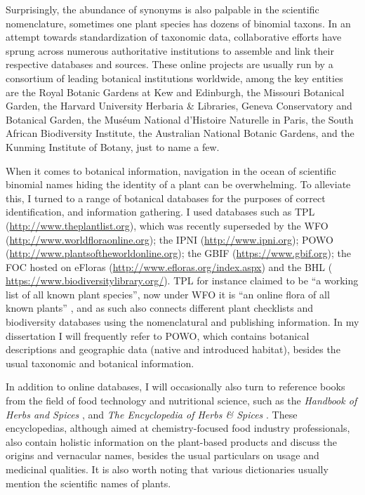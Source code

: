 Surprisingly, the abundance of synonyms is also palpable in the scientific nomenclature, sometimes one plant species has dozens of binomial \glspl{taxon}. In an attempt towards standardization of taxonomic data, collaborative efforts have sprung across numerous authoritative institutions to assemble and link their respective databases and sources. These online projects are usually run by a consortium of leading botanical institutions worldwide, among the key entities are the Royal Botanic Gardens at Kew and Edinburgh, the Missouri Botanical Garden, the Harvard University Herbaria \& Libraries, Geneva Conservatory and Botanical Garden, the Muséum National d'Histoire Naturelle in Paris, the South African Biodiversity Institute, the Australian National Botanic Gardens, and the Kunming Institute of Botany, just to name a few.

When it comes to botanical information, navigation in the ocean of scientific binomial names hiding the identity of a plant can be overwhelming. To alleviate this, I turned to a range of botanical databases for the purposes of correct identification, and information gathering. I used databases such as \gls{TPL} (\url{http://www.theplantlist.org}), which was recently superseded by the \gls{WFO} (\url{http://www.worldfloraonline.org}); the \gls{IPNI} (\url{http://www.ipni.org}); \gls{POWO} (\url{http://www.plantsoftheworldonline.org}); the \gls{GBIF} (\url{https://www.gbif.org}); the \gls{FOC} hosted on eFloras (\url{http://www.efloras.org/index.aspx}) and the \gls{BHL} (\url{ https://www.biodiversitylibrary.org/}). \gls{TPL} for instance claimed to be ``a working list of all known plant species'', now under \gls{WFO} it is ``an online flora of all known plants'' , and as such also connects different plant checklists and biodiversity databases using the nomenclatural and publishing information. In my dissertation I will frequently refer to \gls{POWO}, which contains botanical descriptions and geographic data (native and introduced habitat), besides the usual taxonomic and botanical information. 

In addition to online databases, I will occasionally also turn to reference books from the field of food technology and nutritional science, such as the \textit{Handbook of Herbs and Spices} \autocite{peter_handbook_2012,peter_handbook_2006}, and \textit{The Encyclopedia of Herbs \& Spices} \autocite{ravindran_encyclopedia_2017}. These encyclopedias, although aimed at chemistry-focused food industry professionals, also contain holistic information on the plant-based products and discuss the origins and vernacular names, besides the usual particulars on usage and medicinal qualities. It is also worth noting that various dictionaries usually mention the scientific names of plants.

